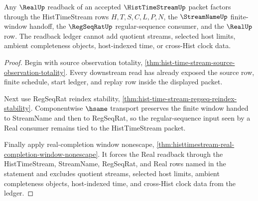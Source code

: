 \begin{theorem}
\label{thm:hist-time-stream-real-readback-ledger}
Any $\RealUp$ readback of an accepted $\HistTimeStreamUp$ packet factors through the HistTimeStream rows $H,T,S,C,L,P,N$, the $\StreamNameUp$ finite-window handoff, the $\RegSeqRatUp$ regular-sequence consumer, and the $\RealUp$ row. The readback ledger cannot add quotient streams, selected host limits, ambient completeness objects, host-indexed time, or cross-Hist clock data.
\end{theorem}
\begin{proof}
Begin with source observation totality, \autoref{thm:hist-time-stream-source-observation-totality}. Every downstream read has already exposed the source row, finite schedule, start ledger, and replay row inside the displayed packet.

Next use RegSeqRat reindex stability, \autoref{thm:hist-time-stream-regseq-reindex-stability}. Componentwise $\hsame$ transport preserves the finite window handed to StreamName and then to RegSeqRat, so the regular-sequence input seen by a Real consumer remains tied to the HistTimeStream packet.

Finally apply real-completion window nonescape, \autoref{thm:histtimestream-real-completion-window-nonescape}. It forces the Real readback through the HistTimeStream, StreamName, RegSeqRat, and Real rows named in the statement and excludes quotient streams, selected host limits, ambient completeness objects, host-indexed time, and cross-Hist clock data from the ledger.
\end{proof}

